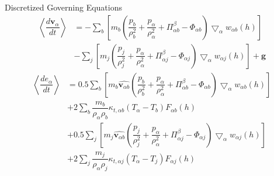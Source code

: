 \documentclass{beamer}
\begin{document}
\begin{frame}{Discretized Governing Equations}
\begin{equation}
\begin{split}
\left\langle\dfrac{d \textbf{v}_{\alpha}}{d t}\right\rangle 
& =-\sum_b \left[ m_b \left(\dfrac{p_b}{\rho_b^2} + \dfrac{p_{\alpha}}{\rho_{\alpha}^2} + \Pi_{\alpha b}^{\beta} - \Phi_{\alpha b}\right) \bigtriangledown_{\alpha}w_{\alpha b}\left(h\right)\right] \\
& -\sum_j \left[m_j \left(\dfrac{p_j}{\rho_j^2} + \dfrac{p_{\alpha}}{\rho_{\alpha}^2} + \Pi_{\alpha j}^{\beta} - \Phi_{\alpha j}\right) \bigtriangledown_{\alpha}w_{\alpha j}\left(h\right)\right]
+\textbf{g}
\end{split}
\label{eq:gov-sph-v}
\end{equation}
\begin{equation}
\begin{split}
\left\langle\dfrac{d e_{\alpha}}{d t}\right\rangle
& = 0.5\sum_b \left[m_b \widehat{\textbf{v}_{\alpha b}}\left(\dfrac{p_b}{\rho_b^2} + \dfrac{p_{\alpha}}{\rho_{\alpha}^2} + \Pi_{\alpha b}^{\beta} - \Phi_{\alpha b}\right) \bigtriangledown_{\alpha}w_{\alpha b}\left(h\right)\right] \\
& + 2 \sum_b \dfrac{m_b}{\rho_{\alpha} \rho_b} \kappa_{t,\alpha b} \left(T_{\alpha} - T_b\right) F_{\alpha b} \left(h\right) \\
& +0.5\sum_j \left[m_j \widehat{\textbf{v}_{\alpha b}}\left(\dfrac{p_j}{\rho_j^2} + \dfrac{p_{\alpha}}{\rho_{\alpha}^2} + \Pi_{\alpha j}^{\beta} - \Phi_{\alpha j}\right) \bigtriangledown_{\alpha}w_{\alpha j}\left(h\right)\right] \\
& + 2 \sum_j \dfrac{m_j}{\rho_{\alpha} \rho_j} \kappa_{t,\alpha j} \left(T_{\alpha} - T_j\right) F_{\alpha j} \left(h\right)
\end{split}
\label{eq:gov-sph-e}
\end{equation}
\end{frame}
\end{document}
